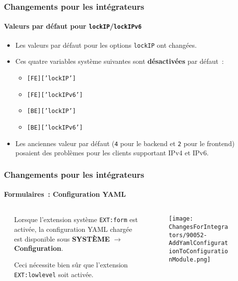 \begin{frame}[fragile]
	\frametitle{Changements pour les intégrateurs}
	\framesubtitle{Valeurs par défaut pour \texttt{lockIP}/\texttt{lockIPv6}}

	\lstset{basicstyle=\smaller\ttfamily}

	\begin{itemize}
		\item Les valeurs par défaut pour les options \texttt{lockIP} ont changées.
		\item Ces quatre variables système suivantes sont \textbf{désactivées} par défaut~:

			\begin{itemize}
				\item \texttt{[FE]['lockIP']}
				\item \texttt{[FE]['lockIPv6']}
				\item \texttt{[BE]['lockIP']}
				\item \texttt{[BE]['lockIPv6']}
			\end{itemize}

		\item Les anciennes valeur par défaut (\texttt{4} pour le backend et \texttt{2} pour le frontend)
			posaient des problèmes pour les clients supportant IPv4 et IPv6.

	\end{itemize}

\end{frame}


\begin{frame}[fragile]
	\frametitle{Changements pour les intégrateurs}
	\framesubtitle{Formulaires~: Configuration YAML}

	\begin{columns}[T]
		\begin{column}{.04\textwidth}
		\end{column}
		\begin{column}{.38\textwidth}

			Lorsque l'extension système \texttt{EXT:form} est activée, la configuration YAML chargée
			est disponible sous \textbf{SYSTÈME} $\rightarrow$ \textbf{Configuration}.

			\vspace{0.2cm}

			Ceci nécessite bien sûr que l'extension \texttt{EXT:lowlevel} soit activée.

		\end{column}
		\begin{column}{.58\textwidth}
			\vspace{-0.3cm}
			\begin{figure}
				\texttt{[image: ChangesForIntegrators/90052-AddYamlConfigurationToConfigurationModule.png]}
			\end{figure}
		\end{column}
	\end{columns}

\end{frame}

